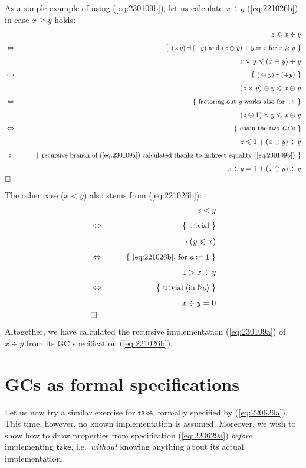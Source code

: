 \documentclass{elsarticle}
\newcommand{\Varid}[1]{\mathit{#1}}
\renewcommand{\leq}{\leqslant}
\renewcommand{\geq}{\geqslant}
\def\N{\mathbb{N}\index{Números naturais ($I\!\!N$)}}
\def\just#1#2{\\ &#1& \rule{2em}{0pt} \{ \mbox{\rule[-.7em]{0pt}{1.8em} \small #2 \/} \} \nonumber\\ && }
\def\qed{\\&\Box&\nonumber}
\def\start{&&}
\def\equiv{\Leftrightarrow}
\begin{document}
As a simple example of using (\ref{eq:230109b}), let us calculate \ensuremath{{\Varid{x}}\div{\Varid{y}}}
(\ref{eq:221026b}) in case \ensuremath{\Varid{x}\geq \Varid{y}} holds:
\begin{eqnarray*}
\start
	\ensuremath{\Varid{z}\leq \Varid{x}\div \Varid{y}}
%
%
%
\just\equiv{ \ensuremath{( \times \Varid{y})\mathbin\dashv (\div \Varid{y})} and \ensuremath{({\Varid{x}}\ominus{\Varid{y}})\mathbin{+}\Varid{y}\mathrel{=}\Varid{x}} for \ensuremath{\Varid{x}\geq \Varid{y}}}
%
	\ensuremath{\Varid{z} \times \Varid{y}\leq ({\Varid{x}}\ominus{\Varid{y}})\mathbin{+}\Varid{y}}
%
\just\equiv{ \ensuremath{({}\ominus{\Varid{y}})\mathbin\dashv (\mathbin{+}\Varid{y})} }
%
	\ensuremath{{(\Varid{z} \times \Varid{y})}\ominus{\Varid{y}}\leq {\Varid{x}}\ominus{\Varid{y}}}
%
\just\equiv{ factoring out \ensuremath{\Varid{y}} works also for \ensuremath{{}\ominus{}}}
%
	\ensuremath{({\Varid{z}}\ominus{\mathrm{1}}) \times \Varid{y}\leq {\Varid{x}}\ominus{\Varid{y}}}
%
\just\equiv{ chain the two \emph{GC}s }
%
%
%
	\ensuremath{\Varid{z}\leq \mathrm{1}\mathbin{+}{({\Varid{x}}\ominus{\Varid{y}})}\div{\Varid{y}}}
%
\just{::}{recursive branch of (\ref{eq:230109a}) calculated thanks to indirect equality (\ref{eq:230109b}) }
%
	\ensuremath{{\Varid{x}}\div{\Varid{y}}\mathrel{=}\mathrm{1}\mathbin{+}{({\Varid{x}}\ominus{\Varid{y}})}\div{\Varid{y}}}
%
\qed
\end{eqnarray*}
The other case (\ensuremath{\Varid{x}\mathbin{<}\Varid{y}}) also stems from (\ref{eq:221026b}):
\begin{eqnarray*}
\start
\ensuremath{\Varid{x}\mathbin{<}\Varid{y}}
\just\equiv{trivial}
\ensuremath{\neg \;(\Varid{y}\leq \Varid{x})}
\just\equiv{ \ref{eq:221026b}, for \ensuremath{\Varid{a}\mathbin{:=}\mathrm{1}} }
\ensuremath{\mathrm{1}\mathbin{>}{\Varid{x}}\div{\Varid{y}}}
\just\equiv{trivial (in \ensuremath{\N_0})}
\ensuremath{{\Varid{x}}\div{\Varid{y}}\mathrel{=}\mathrm{0}}
\qed
\end{eqnarray*}
Altogether, we have calculated the recursive implementation (\ref{eq:230109a}) of \ensuremath{{\Varid{x}}\div{\Varid{y}}}  from its GC specification (\ref{eq:221026b}). 

\section{GCs as formal specifications} \label{seq:230303d}
Let us now try a similar exercise for \ensuremath{\mathsf{take}}, formally specified by (\ref{eq:220629a}).
This time, however, no known implementation is assumed.
Moreover, we wish to show how to draw properties from specification (\ref{eq:220629a})
\emph{before} implementing \ensuremath{\mathsf{take}}, i.e.\ \emph{without} knowing anything about its actual implementation.
\end{document}
